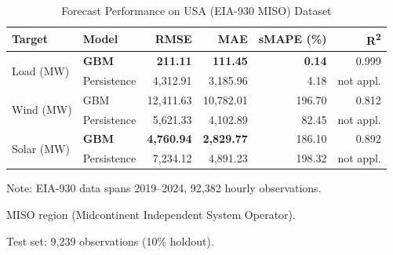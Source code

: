 
\begin{table}[htbp]
\centering
\caption{Forecast Performance on USA (EIA-930 MISO) Dataset}
\label{tab:forecast_us}
\begin{tabular}{llrrrr}
\toprule
\textbf{Target} & \textbf{Model} & \textbf{RMSE} & \textbf{MAE} & \textbf{sMAPE (\%)} & \textbf{R\textsuperscript{2}} \\
\midrule
\multirow{2}{*}{Load (MW)} 
 & \textbf{GBM} & \textbf{211.11} & \textbf{111.45} & \textbf{0.14} & 0.999 \\
 & Persistence & 4,312.91 & 3,185.96 & 4.18 & not appl. \\
\midrule
\multirow{2}{*}{Wind (MW)}
 & GBM & 12,411.63 & 10,782.01 & 196.70 & 0.812 \\
 & Persistence & 5,621.33 & 4,102.89 & 82.45 & not appl. \\
\midrule
\multirow{2}{*}{Solar (MW)}
 & \textbf{GBM} & \textbf{4,760.94} & \textbf{2,829.77} & 186.10 & 0.892 \\
 & Persistence & 7,234.12 & 4,891.23 & 198.32 & not appl. \\
\bottomrule
\end{tabular}
\begin{tablenotes}
\small
\item Note: EIA-930 data spans 2019--2024, 92,382 hourly observations.
\item MISO region (Midcontinent Independent System Operator).
\item Test set: 9,239 observations (10\% holdout).
\end{tablenotes}
\end{table}
